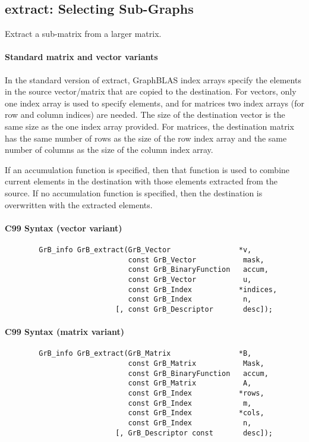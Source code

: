 \subsection{{\sf extract}: Selecting Sub-Graphs}

Extract a sub-matrix from a larger matrix. 

\paragraph{Standard matrix and vector variants}

In the standard version of {\sf extract}, GraphBLAS index arrays
specify the elements in the source vector/matrix that are copied to
the destination.  For vectors, only one index array is used to specify
elements, and for matrices two index arrays (for row and column indices)
are needed.  The size of the destination vector is the same size as
the one index array provided.  For matrices, the destination matrix has
the same number of rows as the size of the row index array and the same
number of columns as the size of the column index array.

If an accumulation function is specified,
then that function is
used to combine current elements in the destination with those elements
extracted from the source. If no accumulation function is specified, then
the destination is overwritten with the extracted elements.

\paragraph{C99 Syntax (vector variant)}

\begin{verbatim}
        GrB_info GrB_extract(GrB_Vector                *v,
                             const GrB_Vector           mask,
                             const GrB_BinaryFunction   accum,
                             const GrB_Vector           u,
                             const GrB_Index           *indices,
                             const GrB_Index            n,
                          [, const GrB_Descriptor       desc]);
\end{verbatim}

\paragraph{C99 Syntax (matrix variant)}

\begin{verbatim}                 
        GrB_info GrB_extract(GrB_Matrix                *B,
                             const GrB_Matrix           Mask,
                             const GrB_BinaryFunction   accum,
                             const GrB_Matrix           A,
                             const GrB_Index           *rows,
                             const GrB_Index            m,
                             const GrB_Index           *cols,
                             const GrB_Index            n,
                          [, GrB_Descriptor const       desc]);
\end{verbatim}

